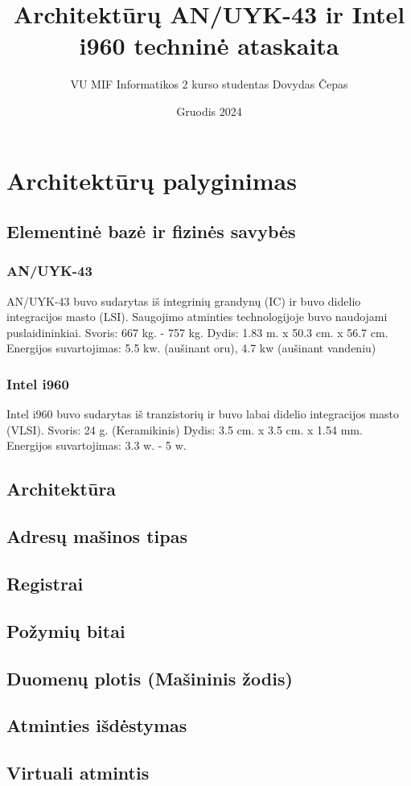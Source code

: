 \documentclass{article}
\title{Architektūrų AN/UYK-43 ir Intel i960 techninė ataskaita}
\author{VU MIF Informatikos 2 kurso studentas Dovydas Čepas}
\date{Gruodis 2024}
\begin{document}
\maketitle
\newpage
\section{Architektūrų palyginimas}
\subsection{Elementinė bazė ir fizinės savybės}
\subsubsection{AN/UYK-43}
AN/UYK-43 buvo sudarytas iš integrinių grandynų (IC) ir buvo didelio integracijos masto (LSI). Saugojimo atminties technologijoje buvo naudojami puslaidininkiai. Svoris: 667 kg. - 757 kg. Dydis: 1.83 m. x 50.3 cm. x 56.7 cm. Energijos suvartojimas: 5.5 kw. (aušinant oru), 4.7 kw (aušinant vandeniu)
\subsubsection{Intel i960}
Intel i960 buvo sudarytas iš tranzistorių ir buvo labai didelio integracijos masto (VLSI). Svoris: 24 g. (Keramikinis) Dydis: 3.5 cm. x 3.5 cm. x 1.54 mm. Energijos suvartojimas: 3.3 w. - 5 w.
\subsection{Architektūra}
\subsection{Adresų mašinos tipas}
\subsection{Registrai}
\subsection{Požymių bitai}
\subsection{Duomenų plotis (Mašininis žodis)}
\subsection{Atminties išdėstymas}
\subsection{Virtuali atmintis}
\end{document}
